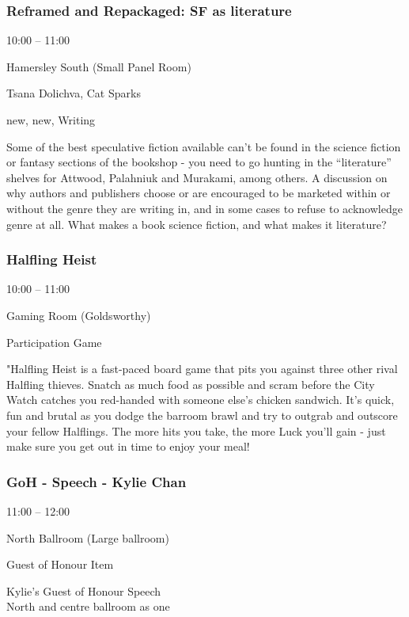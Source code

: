 \documentclass{scrreprt}
\begin{document}
\begin{multicols}{2}
\subsubsection*{Reframed and Repackaged: SF as literature}\begin{description}
\setlength{\itemsep}{0pt}
\setlength{\parsep}{0pt}
\setlength{\parskip}{0pt}
\item[Time:]{10:00 -- 11:00}
\item[Venue:]{Hamersley South (Small Panel Room)}
\item[People:]{Tsana Dolichva, Cat Sparks}
\item[Tags:]{new, new, Writing}\end{description}
Some of the best speculative fiction available can’t be found in the science fiction or fantasy sections of the bookshop - you need to go hunting in the “literature” shelves for Attwood, Palahniuk and Murakami, among others. A discussion on why authors and publishers choose or are encouraged to be marketed within or without the genre they are writing in, and in some cases to refuse to acknowledge genre at all. What makes a book science fiction, and what makes it literature?
\subsubsection*{Halfling Heist}\begin{description}
\setlength{\itemsep}{0pt}
\setlength{\parsep}{0pt}
\setlength{\parskip}{0pt}
\item[Time:]{10:00 -- 11:00}
\item[Venue:]{Gaming Room (Goldsworthy)}
\item[Tags:]{Participation Game}\end{description}
"Halfling Heist is a fast-paced board game that pits you against three other rival Halfling thieves. Snatch as much food as possible and scram before the City Watch catches you red-handed with someone else’s chicken sandwich. It’s quick, fun and brutal as you dodge the barroom brawl and try to outgrab and outscore your fellow Halflings. The more hits you take, the more Luck you’ll gain - just make sure you get out in time to enjoy your meal!
\subsubsection*{GoH - Speech - Kylie Chan}\begin{description}
\setlength{\itemsep}{0pt}
\setlength{\parsep}{0pt}
\setlength{\parskip}{0pt}
\item[Time:]{11:00 -- 12:00}
\item[Venue:]{North Ballroom (Large ballroom)}
\item[Tags:]{Guest of Honour Item}\end{description}
Kylie's Guest of Honour Speech\\North and centre ballroom as one

\end{multicols}
\end{document}

